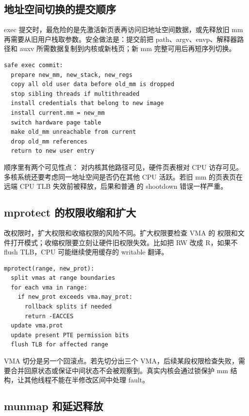 \subsection{地址空间切换的提交顺序}

exec 提交时，最危险的是先激活新页表再访问旧地址空间数据，或先释放旧 mm 再需要从旧用户栈取参数。安全做法是：提交前把 path、argv、envp、解释器路径和 auxv 所需数据复制到内核或新栈页；新 mm 完整可用后再短序列切换。

\begin{lstlisting}
safe exec commit:
  prepare new_mm, new_stack, new_regs
  copy all old user data before old_mm is dropped
  stop sibling threads if multithreaded
  install credentials that belong to new image
  install current.mm = new_mm
  switch hardware page table
  make old_mm unreachable from current
  drop old_mm references
  return to new user entry
\end{lstlisting}

顺序里有两个可见性点： 对内核其他路径可见，硬件页表根对 CPU 访存可见。多核系统还要考虑同一地址空间是否仍在其他 CPU 活跃。若旧 mm 的页表页在远端 CPU TLB 失效前被释放，后果和普通  的 shootdown 错误一样严重。

\subsection{mprotect 的权限收缩和扩大}

 改权限时，扩大权限和收缩权限的风险不同。扩大权限要检查 VMA 的  权限和文件打开模式；收缩权限要立刻让硬件旧权限失效。比如把 RW 改成 R，如果不 flush TLB，CPU 可能继续使用缓存的 writable 翻译。

\begin{lstlisting}
mprotect(range, new_prot):
  split vmas at range boundaries
  for each vma in range:
    if new_prot exceeds vma.may_prot:
      rollback splits if needed
      return -EACCES
  update vma.prot
  update present PTE permission bits
  flush TLB for affected range
\end{lstlisting}

VMA 切分是另一个回滚点。若先切分出三个 VMA，后续某段权限检查失败，需要合并回原状态或保证中间状态不会被观察到。真实内核会通过锁保护 mm 结构，让其他线程不能在半修改区间中处理 fault。

\subsection{munmap 和延迟释放}

